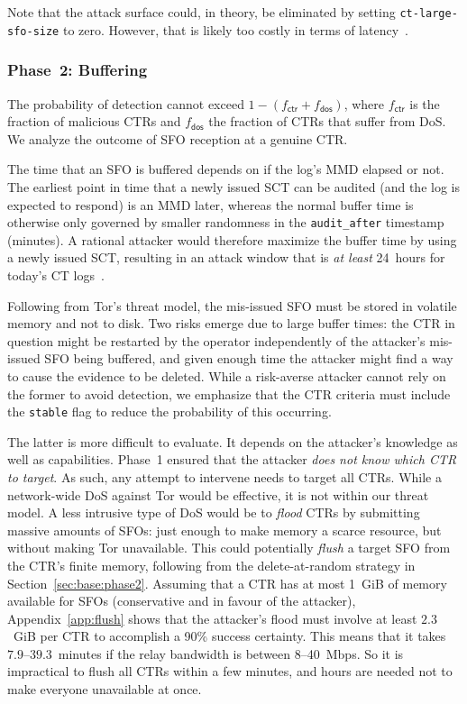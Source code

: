 Note that the attack surface could, in theory, be eliminated by setting
\texttt{ct-large-sfo-size} to zero.  However, that is likely  too costly in
terms of latency~\cite{no-hard-fail}.

\subsubsection{Phase~2: Buffering} \label{sec:analysis:pr:phase2}
The probability of detection cannot exceed $1-(f_{\mathsf{ctr}} +
f_{\mathsf{dos}})$, where $f_{\mathsf{ctr}}$ is the fraction of
malicious CTRs and $f_{\mathsf{dos}}$ the fraction of CTRs that suffer from
DoS.  We analyze the outcome of SFO reception at a genuine CTR\@.

The time that an SFO is buffered depends on if the log's MMD elapsed or not.
The earliest point in time that a newly issued SCT can be audited (and the log
is expected to respond) is an MMD later, whereas the normal buffer time is
otherwise only governed by smaller randomness in the \texttt{audit\_after}
timestamp (minutes).  A rational attacker would therefore maximize the buffer
time by using a newly issued SCT, resulting in an attack window that is \emph{at
least} 24~hours for today's CT logs~\cite{google-log-policy}.

Following from Tor's threat model, the mis-issued SFO must be stored in volatile
memory and not to disk.  Two risks emerge due to large buffer times:
	the CTR in question might be restarted by the operator independently of the
		attacker's mis-issued SFO being buffered,
	and given enough time the attacker might find a way to cause the evidence to
		be deleted.
While a risk-averse attacker cannot rely on the former to avoid detection, we
emphasize that the CTR criteria must include the \texttt{stable} flag to reduce
the probability of this occurring.

The latter is more difficult to evaluate.  It depends on the attacker's
knowledge as well as capabilities.  Phase~1 ensured that the attacker \emph{does
not know which CTR to target}.  As such, any attempt to intervene needs to
target all CTRs.  While a network-wide DoS against Tor would be effective, it is
not within our threat model.  A less intrusive type of DoS would be to
\emph{flood} CTRs by submitting massive amounts of SFOs: just enough to make
memory a scarce resource, but without making Tor unavailable. This could
potentially \emph{flush} a target SFO from the CTR's finite memory, following
from the delete-at-random strategy in Section~\ref{sec:base:phase2}. Assuming
that a CTR has at most 1~GiB of memory available for SFOs (conservative and in
favour of the attacker), Appendix~\ref{app:flush} shows that the attacker's
flood must involve at least $2.3$~GiB per CTR to accomplish a 90\% success
certainty.  This means that it takes $7.9$--$39.3$~minutes if the relay
bandwidth is between 8--40~Mbps.  So it is impractical to flush all CTRs within
a few minutes, and hours are needed not to make everyone unavailable at once.

